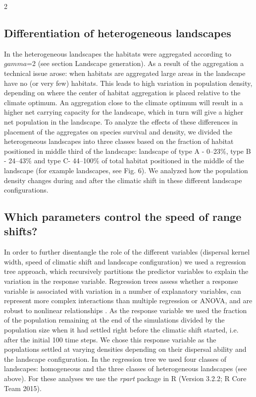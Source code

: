 \documentclass[12pt,pdftex]{article}
\begin{document}
\begin{spacing}{2}
\subsection*{Differentiation of heterogeneous landscapes}
In the heterogeneous landscapes the habitats were aggregated according to $gamma$=2 (see section Landscape generation). As a result of the aggregation a technical issue arose: when habitats are aggregated large areas in the landscape have no (or very few) habitats. This leads to high variation in population density, depending on where the center of habitat aggregation is placed relative to the climate optimum. An aggregation close to the climate optimum will result in a higher net carrying capacity for the landscape, which in turn will give a higher net population in the landscape. To analyze the effects of these differences in placement of the aggregates on species survival and density, we divided the heterogeneous landscapes into three classes based on the fraction of habitat positioned in middle third of the landscape:  landscape of type A - 0--23\%, type B - 24--43\%  and type C- 44--100\% of total habitat positioned in the middle of the landscape (for example landscapes, see Fig. 6). We analyzed how the population density changes during and after the climatic shift in these different landscape configurations. 

\subsection*{Which parameters control the speed of range shifts?} 
In order to further disentangle the role of the different variables (dispersal kernel width, speed of climatic shift and landscape configuration) we used a regression tree approach, which recursively partitions the predictor variables to explain the variation in the response variable. Regression trees assess whether a response variable is associated with variation in a number of explanatory variables, can represent more complex interactions than multiple regression or ANOVA, and are robust to nonlinear relationships \citep{Death2000, Brose2005a}. As the response variable we used the fraction of the population remaining at the end of the simulations divided by the population size when it had settled right before the climatic shift started, i.e. after the initial 100 time steps. We chose this response variable as the populations settled at varying densities depending on their dispersal ability and the landscape configuration. In the regression tree we used four classes of landscapes: homogeneous and the three classes of heterogeneous landscapes (see above). For these analyses we use the {\em rpart} package in \textsf{R} (Version 3.2.2; R Core Team 2015). 




\end{spacing}
\end{document}
